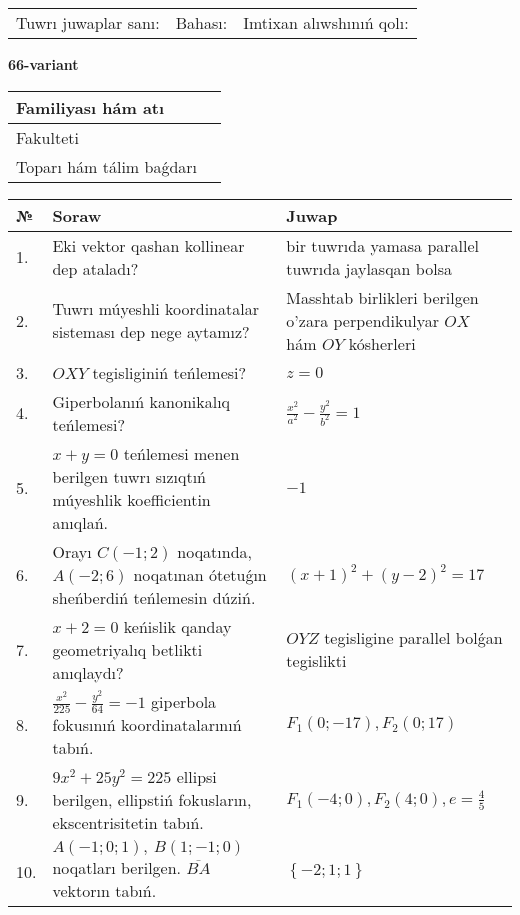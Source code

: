 \documentclass{article}
\begin{document}
\vspace{1cm}

\begin{tabular}{lll}
Tuwrı juwaplar sanı: \underline{\hspace{1.5cm}} & 
Bahası: \underline{\hspace{1.5cm}} & 
Imtixan alıwshınıń qolı: \underline{\hspace{2cm}} \\
\end{tabular}

\egroup

\newpage


\textbf{66-variant}\\

\bgroup
\def\arraystretch{1.6} %

\begin{tabular}{|m{5.7cm}|m{9.5cm}|}
\hline
Familiyası hám atı & \\
\hline
Fakulteti  & \\
\hline
Toparı hám tálim baǵdarı  & \\
\hline
\end{tabular}

\vspace{1cm}

\begin{tabular}{|m{0.7cm}|m{10cm}|m{4cm}|}
\hline
№ & Soraw & Juwap \\
\hline
1. & Eki vektor qashan kollinear dep ataladı? & bir tuwrıda yamasa parallel tuwrıda jaylasqan bolsa \\
\hline
2. & Tuwrı múyeshli koordinatalar sisteması dep nege aytamız? & Masshtab birlikleri berilgen o'zara perpendikulyar $OX$ hám $OY$ kósherleri \\
\hline
3. & $OXY$ tegisliginiń teńlemesi? & $z=0$ \\
\hline
4. & Giperbolanıń kanonikalıq teńlemesi? & $\frac{x^2}{a^2}-\frac{y^2}{b^2}=1$ \\
\hline
5. & $x+y=0$ teńlemesi menen berilgen tuwrı sızıqtıń múyeshlik koefficientin anıqlań. & $- 1$ \\
\hline
6. & Orayı $C (-1;2)$ noqatında, $A (-2;6 )$ noqatınan ótetuǵın sheńberdiń teńlemesin dúziń. & $(x+1)^{2}+(y-2)^{2}=17$ \\
\hline
7. & $x+2=0$ keńislik qanday geometriyalıq betlikti anıqlaydı? &  $OYZ$ tegisligine parallel bolǵan tegislikti \\
\hline
8. & $\frac{x^{2}}{225}-\frac{y^{2}}{64}=-1$ giperbola fokusınıń koordinatalarınıń tabıń. & $F_{1}(0;-17), F_{2}(0;17)$ \\
\hline
9. & $9x^{2}+25y^{2}=225$ ellipsi berilgen, ellipstiń fokusların, ekscentrisitetin tabıń. & $F_1\left(-4;0 \right) , F_2\left( 4;0 \right) , e = \frac{4}{5}$ \\
\hline
10. & $A (-1;0;1),\ B (1;-1;0)$ noqatları berilgen. $\overline{BA}$ vektorın tabıń. & $\left\{ - 2;1;1 \right\}$ \\
\hline
\end{tabular}
\end{document}
